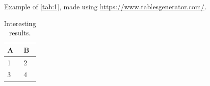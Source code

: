 




























Example of \autoref{tab:1}, made using \url{https://www.tablesgenerator.com/}.


\begin{table}
    \centering
    \begin{tabular}{@{}ll@{}}
        \toprule
        \textbf{A} & \textbf{B} \\ \midrule
        1          & 2          \\
        3          & 4          \\ \bottomrule
    \end{tabular}
    \caption{Interesting results.}
    \label{tab:1}
\end{table}






